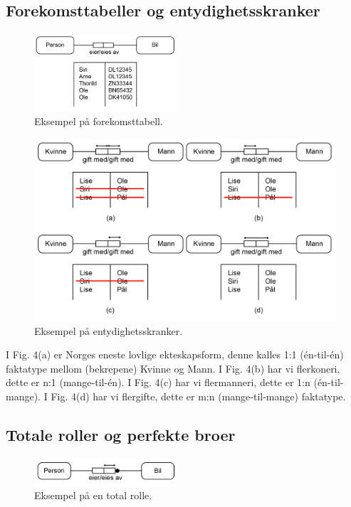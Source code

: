 \documentclass[11pt,a4paper]{article}
\begin{document}
\subsection{Forekomsttabeller og entydighetsskranker}
\begin{figure}[h!]
	\centering
		\includegraphics[width=200px]{img/for-01.png}
	\caption{Eksempel på forekomsttabell.}
\end{figure}

\begin{figure}[h!]
	\centering
		\includegraphics[width=\linewidth]{img/sk-01.png}
	\caption{Eksempel på entydighetsskranker.}
\end{figure}

I Fig. 4(a) er Norges eneste lovlige ekteskapsform, denne kalles 1:1 (én-til-én) faktatype mellom (bekrepene) Kvinne og Mann.
I Fig. 4(b) har vi flerkoneri, dette er n:1 (mange-til-én).
I Fig. 4(c) har vi flermanneri, dette er 1:n (én-til-mange).
I Fig. 4(d) har vi flergifte, dette er m:n (mange-til-mange) faktatype.

\subsection{Totale roller og perfekte broer}
\begin{figure}[h!]
	\centering
		\includegraphics[width=200px]{img/tot-01.png}
	\caption{Eksempel på en total rolle.}
\end{figure}
\end{document}
